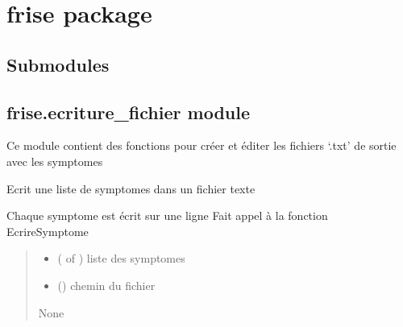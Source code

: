 \documentclass[letterpaper,10pt,english]{sphinxmanual}
\begin{document}
\sphinxstepscope


\chapter{frise package}
\label{\detokenize{frise:frise-package}}\label{\detokenize{frise::doc}}

\section{Submodules}
\label{\detokenize{frise:submodules}}

\section{frise.ecriture\_fichier module}
\label{\detokenize{frise:module-frise.ecriture_fichier}}\label{\detokenize{frise:frise-ecriture-fichier-module}}
\sphinxAtStartPar
Ce module contient des fonctions pour créer et éditer les fichiers ‘.txt’ de sortie avec les symptomes

\begin{fulllineitems}
\label{\detokenize{frise:frise.ecriture_fichier.EcrireListeSymptome}}
\pysigstartsignatures
{}
\pysigstopsignatures
\sphinxAtStartPar
Ecrit une liste de symptomes dans un fichier texte

\sphinxAtStartPar
Chaque symptome est écrit sur une ligne
Fait appel à la fonction EcrireSymptome
\begin{quote}\begin{description}
\begin{itemize}
\item {} 
\sphinxAtStartPar
{} ( of ) \textendash{} liste des symptomes

\item {} 
\sphinxAtStartPar
{} () \textendash{} chemin du fichier

\end{itemize}

\sphinxAtStartPar
None

\end{description}\end{quote}

\end{fulllineitems}
\end{document}
